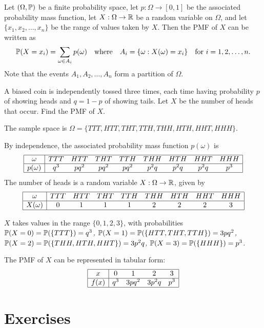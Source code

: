 Let $(\Omega,\mathbb{P})$ be a finite probability space, let $p:\Omega\to [0,1]$ be the associated probability mass function, let $X:\Omega\to\mathbb{R}$ be a random variable on $\Omega$, and let $\{x_1,x_2,\ldots,x_n\}$ be the range of values taken by $X$.
Then the PMF of $X$ can be written as
\[
\mathbb{P}(X=x_i) = \sum_{\omega\in A_i} p(\omega) \quad\text{where}\quad A_i = \{\omega:X(\omega) = x_i\} \quad\text{for $i=1,2,\ldots,n$}.
\]
Note that the events $A_1,A_2,\ldots,A_n$ form a partition of $\Omega$.

\newpage

\begin{example}\label{ex:binomial}
A biased coin is independently tossed three times, each time having probability $p$ of showing heads and $q=1-p$ of showing tails. Let $X$ be the number of heads that occur. Find the PMF of $X$.
\end{example}

\begin{solution}
The sample space is $\Omega=\{TTT,HTT,THT,TTH,THH,HTH,HHT,HHH\}$.
\par
By independence, the associated probability mass function $p(\omega)$ is 
\[
\begin{array}{|c|cccccccc|} \hline
\omega 		& TTT & HTT & THT & TTH & THH & HTH & HHT & HHH \\ \hline
p(\omega) 	& q^3 & pq^2 & pq^2 & pq^2 & p^2q & p^2q & p^2q & p^3 \\  \hline
\end{array}
\]
The number of heads is a random variable $X:\Omega\to\mathbb{R}$, given by
\[
\begin{array}{|c|cccccccc|} \hline
\omega 		& TTT & HTT & THT & TTH & THH & HTH & HHT & HHH \\ \hline
X(\omega) 	& 0 & 1 & 1 & 1 & 2 & 2 & 2 & 3 \\ \hline
\end{array}
\]

$X$ takes values in the range $\{0,1,2,3\}$, with probabilities
\bit
\it $\mathbb{P}(X=0) = \mathbb{P}(\{TTT\}) = q^3$,
\it $\mathbb{P}(X=1) = \mathbb{P}(\{HTT,THT,TTH\}) = 3pq^2$,
\it $\mathbb{P}(X=2) = \mathbb{P}(\{THH,HTH,HHT\}) = 3p^2q$,
\it $\mathbb{P}(X=3) = \mathbb{P}(\{HHH\}) = p^3$.
\eit

The PMF of $X$ can be represented in tabular form:
\[
\begin{array}{|c|cccc|} \hline
x 		& 0 & 1 & 2 & 3 \\ \hline
f(x)	& q^3 & 3pq^2 & 3p^2q & p^3 \\ \hline
\end{array}
\]
\end{solution}

\newpage
\section{Exercises}


\endinput
